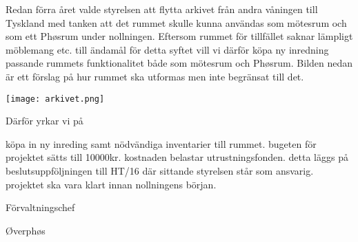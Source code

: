 \documentclass[../_main/handlingar.tex]{subfiles}
\begin{document}
Redan förra året valde styrelsen att flytta arkivet från andra våningen till Tyskland med tanken att det rummet skulle kunna användas som mötesrum och som ett Phøsrum under nollningen. Eftersom rummet för tillfället saknar lämpligt möblemang etc. till ändamål för detta syftet vill vi därför köpa ny inredning passande rummets funktionalitet både som mötesrum och Phøsrum. Bilden nedan är ett förslag på hur rummet ska utformas men inte begränsat till det.

\begin{center}
\texttt{[image: arkivet.png]}
\end{center}

Därför yrkar vi på
\begin{attsatser}
    \att köpa in ny inreding samt nödvändiga inventarier till rummet.
    \att bugeten för projektet sätts till 10000kr.
    \att kostnaden belastar utrustningsfonden.
    \att detta läggs på beslutsuppföljningen till HT/16 där sittande styrelsen står som ansvarig.
    \att projektet ska vara klart innan nollningens början.
\end{attsatser}

\begin{signatures}{2}
    \ist
    \signature{Anders Nilsson}{Förvaltningschef}
    \signature{Molly Rusk}{Øverphøs}
\end{signatures}
\end{document}
